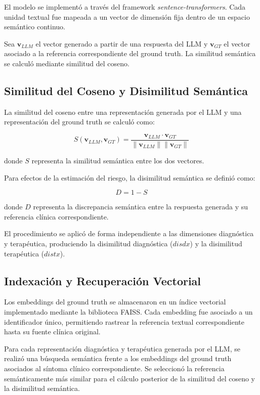 \documentclass[final,11pt,3p]{elsarticle}
\begin{document}
El modelo se implementó a través del framework \textit{sentence-transformers}. Cada unidad textual fue mapeada a un vector de dimensión fija dentro de un espacio semántico continuo.

Sea $\mathbf{v}_{LLM}$ el vector generado a partir de una respuesta del LLM y $\mathbf{v}_{GT}$ el vector asociado a la referencia correspondiente del ground truth. La similitud semántica se calculó mediante similitud del coseno.

\subsection{Similitud del Coseno y Disimilitud Semántica}
\label{S:2.6}

La similitud del coseno entre una representación generada por el LLM y una representación del ground truth se calculó como:

\begin{equation}
S(\mathbf{v}_{LLM},\mathbf{v}_{GT})
=
\frac{
\mathbf{v}_{LLM}\cdot\mathbf{v}_{GT}
}{
\|\mathbf{v}_{LLM}\|\|\mathbf{v}_{GT}\|
}
\label{eq:cosine}
\end{equation}

donde $S$ representa la similitud semántica entre los dos vectores.

Para efectos de la estimación del riesgo, la disimilitud semántica se definió como:

\begin{equation}
D = 1-S
\label{eq:dissimilarity}
\end{equation}

donde $D$ representa la discrepancia semántica entre la respuesta generada y su referencia clínica correspondiente.

El procedimiento se aplicó de forma independiente a las dimensiones diagnóstica y terapéutica, produciendo la disimilitud diagnóstica ($disdx$) y la disimilitud terapéutica ($distx$).

\subsection{Indexación y Recuperación Vectorial}
\label{S:2.7}

Los embeddings del ground truth se almacenaron en un índice vectorial implementado mediante la biblioteca FAISS. Cada embedding fue asociado a un identificador único, permitiendo rastrear la referencia textual correspondiente hasta su fuente clínica original.

Para cada representación diagnóstica y terapéutica generada por el LLM, se realizó una búsqueda semántica frente a los embeddings del ground truth asociados al síntoma clínico correspondiente. Se seleccionó la referencia semánticamente más similar para el cálculo posterior de la similitud del coseno y la disimilitud semántica.
\end{document}
